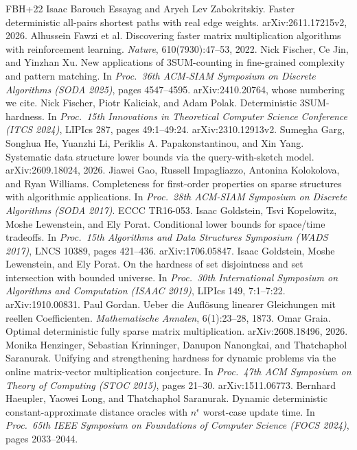 \documentclass[11pt]{article}
\theoremstyle{definition}
\theoremstyle{remark}
\begin{document}
{\begin{thebibliography}{FBH{+}22}
 Isaac Barouch Essayag and Aryeh Lev Zabokritskiy. Faster deterministic all-pairs shortest paths with real edge weights. arXiv:2611.17215v2, 2026.
 Alhussein Fawzi et al. Discovering faster matrix multiplication algorithms with reinforcement learning. \emph{Nature}, 610(7930):47--53, 2022.
 Nick Fischer, Ce Jin, and Yinzhan Xu. New applications of 3SUM-counting in fine-grained complexity and pattern matching. In \emph{Proc.\ 36th ACM-SIAM Symposium on Discrete Algorithms (SODA 2025)}, pages 4547--4595. arXiv:2410.20764, whose numbering we cite.
 Nick Fischer, Piotr Kaliciak, and Adam Polak. Deterministic 3SUM-hardness. In \emph{Proc.\ 15th Innovations in Theoretical Computer Science Conference (ITCS 2024)}, LIPIcs 287, pages 49:1--49:24. arXiv:2310.12913v2.
 Sumegha Garg, Songhua He, Yuanzhi Li, Periklis A. Papakonstantinou, and Xin Yang. Systematic data structure lower bounds via the query-with-sketch model. arXiv:2609.18024, 2026.
 Jiawei Gao, Russell Impagliazzo, Antonina Kolokolova, and Ryan Williams. Completeness for first-order properties on sparse structures with algorithmic applications. In \emph{Proc.\ 28th ACM-SIAM Symposium on Discrete Algorithms (SODA 2017)}. ECCC TR16-053.
 Isaac Goldstein, Tsvi Kopelowitz, Moshe Lewenstein, and Ely Porat. Conditional lower bounds for space/time tradeoffs. In \emph{Proc.\ 15th Algorithms and Data Structures Symposium (WADS 2017)}, LNCS 10389, pages 421--436. arXiv:1706.05847.
 Isaac Goldstein, Moshe Lewenstein, and Ely Porat. On the hardness of set disjointness and set intersection with bounded universe. In \emph{Proc.\ 30th International Symposium on Algorithms and Computation (ISAAC 2019)}, LIPIcs 149, 7:1--7:22. arXiv:1910.00831.
 Paul Gordan. Ueber die Auflösung linearer Gleichungen mit reellen Coefficienten. \emph{Mathematische Annalen}, 6(1):23--28, 1873.
 Omar Graia. Optimal deterministic fully sparse matrix multiplication. arXiv:2608.18496, 2026.
 Monika Henzinger, Sebastian Krinninger, Danupon Nanongkai, and Thatchaphol Saranurak. Unifying and strengthening hardness for dynamic problems via the online matrix-vector multiplication conjecture. In \emph{Proc.\ 47th ACM Symposium on Theory of Computing (STOC 2015)}, pages 21--30. arXiv:1511.06773.
 Bernhard Haeupler, Yaowei Long, and Thatchaphol Saranurak. Dynamic deterministic constant-approximate distance oracles with $n^{\epsilon}$ worst-case update time. In \emph{Proc.\ 65th IEEE Symposium on Foundations of Computer Science (FOCS 2024)}, pages 2033--2044.

\end{thebibliography}}
\end{document}
